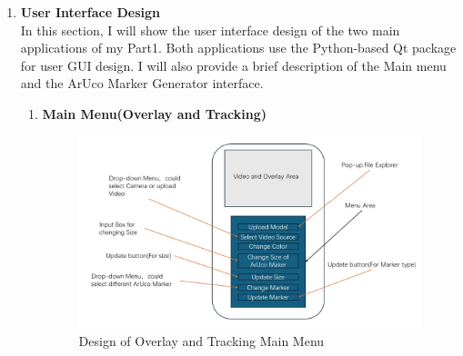 \documentclass[12pt]{article}
\begin{document}
\begin{enumerate}
      \item \textbf{User Interface Design}
            \\
            In this section, I will show the user interface design of the two main applications of my Part1. Both applications use the Python-based Qt package for user GUI design.
            I will also provide a brief description of the Main menu and the ArUco Marker Generator interface.
            \begin{enumerate}
                  \item \textbf{Main Menu(Overlay and Tracking)}
                        \begin{figure}[H]
                              \centering
                              \includegraphics[width=1.2\textwidth]{design_overlay.jpg}
                              \caption{Design of Overlay and Tracking Main Menu}
                        \end{figure}



\end{enumerate}
\end{enumerate}
\end{document}
